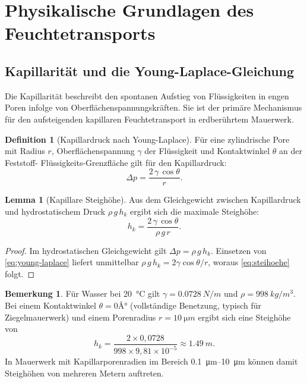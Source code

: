 ﻿\documentclass[a4paper,12pt]{article}
\theoremstyle{definition}
\newtheorem{lemma}[theorem]{Lemma}
\newtheorem{definition}[theorem]{Definition}
\newtheorem{bemerkung}[theorem]{Bemerkung}
\begin{document}
\section{Physikalische Grundlagen des Feuchtetransports}
\label{sec:grundlagen}

\subsection{Kapillarit\"at und die Young-Laplace-Gleichung}

Die Kapillarit\"at beschreibt den spontanen Aufstieg von Fl\"ussigkeiten
in engen Poren infolge von Oberfl\"achenspannungskr\"aften. Sie ist der
prim\"are Mechanismus f\"ur den aufsteigenden kapillaren Feuchtetransport
in erdber\"uhrtem Mauerwerk.

\begin{definition}[Kapillardruck nach Young-Laplace]
\label{def:young-laplace}
F\"ur eine zylindrische Pore mit Radius $r$, Oberfl\"achenspannung
$\gamma$ der Fl\"ussigkeit und Kontaktwinkel $\theta$ an der Feststoff-
Fl\"ussigkeits-Grenzfl\"ache gilt f\"ur den Kapillardruck:
\begin{equation}
  \Delta p = \frac{2\,\gamma\,\cos\theta}{r}.
  \label{eq:young-laplace}
\end{equation}
\end{definition}

\begin{lemma}[Kapillare Steigh\"ohe]
\label{lem:steihoehe}
Aus dem Gleichgewicht zwischen Kapillardruck und hydrostatischem Druck
$\rho\,g\,h_k$ ergibt sich die maximale Steigh\"ohe:
\begin{equation}
  h_k = \frac{2\,\gamma\,\cos\theta}{\rho\,g\,r}.
  \label{eq:steihoehe}
\end{equation}
\end{lemma}

\begin{proof}
Im hydrostatischen Gleichgewicht gilt $\Delta p = \rho\,g\,h_k$.
Einsetzen von \cref{eq:young-laplace} liefert unmittelbar
$\rho\,g\,h_k = 2\gamma\cos\theta/r$, woraus
\cref{eq:steihoehe} folgt. 
\end{proof}

\begin{bemerkung}
F\"ur Wasser bei \SI{20}{\celsius} gilt $\gamma = \SI{0.0728}{N/m}$
und $\rho = \SI{998}{kg/m^3}$. Bei einem Kontaktwinkel $\theta = 0Â°$
(vollst\"andige Benetzung, typisch f\"ur Ziegelmauerwerk) und einem
Porenradius $r = \SI{10}{\micro m}$ ergibt sich eine Steigh\"ohe von
\begin{equation*}
  h_k = \frac{2 \times 0{,}0728}{998 \times 9{,}81 \times 10^{-5}}
      \approx \SI{1.49}{m}.
\end{equation*}
In Mauerwerk mit Kapillarporenradien im Bereich \SIrange{0.1}{10}{\micro m}
k\"onnen damit Steigh\"ohen von mehreren Metern auftreten.
\end{bemerkung}
\end{document}
